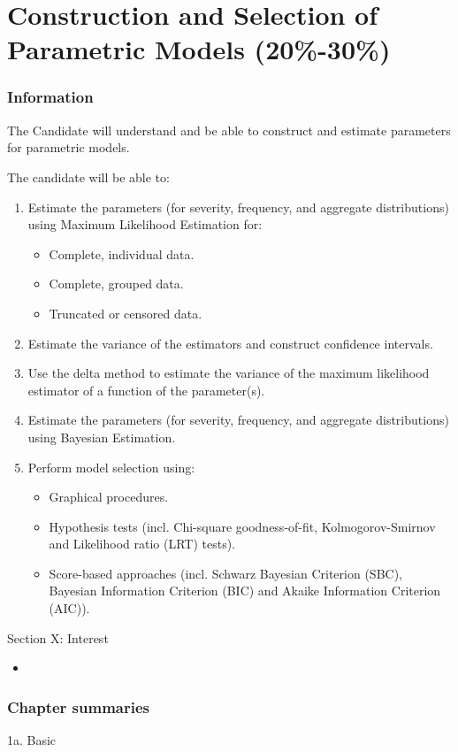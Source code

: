 \chapter[Construction and Selection of Parametric Models]{Construction and Selection of Parametric Models (20\%-30\%)}

\subsection{Information}

\begin{distributions}[Objective]
The Candidate will understand and be able to construct and estimate parameters for parametric models.
\end{distributions}

\begin{outcomes}
The candidate will be able to:
\begin{enumerate}[label = \alph*), leftmargin = *]
	\item	Estimate the parameters (for severity, frequency, and aggregate distributions) using Maximum Likelihood Estimation for:
		\begin{itemize}[leftmargin = *]
		\item	Complete, individual data.
		\item	Complete, grouped data.
		\item	Truncated or censored data.
		\end{itemize}
	\item	Estimate the variance of the estimators and construct confidence intervals.
	\item	Use the delta method to estimate the variance of the maximum likelihood estimator of a function of the parameter(s).
	\item	Estimate the parameters (for severity, frequency, and aggregate distributions) using Bayesian Estimation.
	\item	Perform model selection using:
		\begin{itemize}[leftmargin = *]
		\item	Graphical procedures.
		\item	Hypothesis tests (incl. Chi-square goodness-of-fit, Kolmogorov-Smirnov and Likelihood ratio (LRT) tests).
		\item	Score-based approaches (incl. Schwarz Bayesian Criterion (SBC), Bayesian Information Criterion (BIC) and Akaike Information Criterion (AIC)).
		\end{itemize}
\end{enumerate}
\end{outcomes}

\begin{ASM_chapter}
Section X: Interest 
\begin{itemize}[leftmargin = *]
	\item	{}
\end{itemize}
\end{ASM_chapter}

\subsection{Chapter summaries}

\begin{CHPT_SUMM_AUTO}[label = {L.-1a}]{1a. Basic}

\end{CHPT_SUMM_AUTO}
